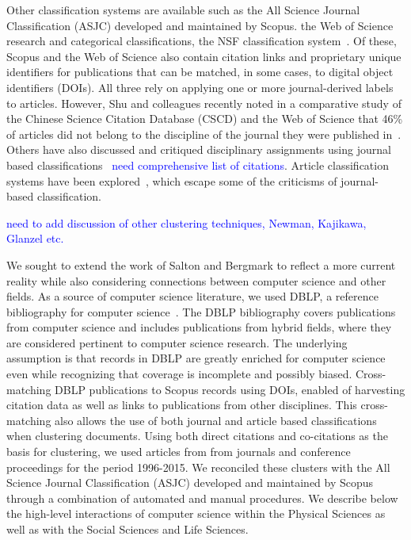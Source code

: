 Other classification systems are available such as the All Science Journal Classification (ASJC) developed and maintained by Scopus. the Web of Science research and categorical classifications, the NSF classification system~\cite{nsf_classification}. Of these, Scopus and the Web of Science also contain citation links and proprietary unique identifiers for publications that can be matched, in some cases, to digital object identifiers (DOIs). All three rely on applying one or more journal-derived labels to articles. However, Shu and colleagues recently noted in a comparative study of the Chinese Science Citation Database (CSCD) and the Web of Science that 46\% of articles did not belong to the discipline of the journal they were published in~\cite{shu_comparing_2019}. Others have also discussed and critiqued disciplinary assignments using journal based classifications~\cite{wang_large-scale_2016} \textcolor{blue}{need comprehensive list of citations}. Article classification systems have been explored~\cite{traag_louvain_2019,boyack_classification_2014,waltman_new_2012}, which escape some of the criticisms of journal-based classification.
 
 \textcolor{blue}{need to add discussion of other clustering techniques, Newman, Kajikawa, Glanzel etc.}
 
We sought to extend the work of Salton and Bergmark to reflect a more current reality while also considering connections between computer science and other fields. As a source of computer science literature, we used DBLP, a reference bibliography for computer science~\cite{dblp_ref}. The DBLP bibliography covers publications from computer science and includes publications from hybrid fields, where they are considered pertinent to computer science research. The underlying assumption is that records in DBLP are greatly enriched for computer science even while recognizing that coverage is incomplete and possibly biased. Cross-matching DBLP publications to Scopus records using DOIs, enabled of harvesting citation data as well as links to publications from other disciplines. This cross-matching also allows the use of both journal and article based classifications when clustering documents. Using both direct citations and co-citations as the basis for clustering, we used articles from from journals and conference proceedings for the period 1996-2015. We reconciled these clusters with the All Science Journal Classification (ASJC) developed and maintained by Scopus through a combination of automated and manual procedures. We describe below the high-level interactions of computer science within the Physical Sciences as well as with the Social Sciences and Life Sciences. 

